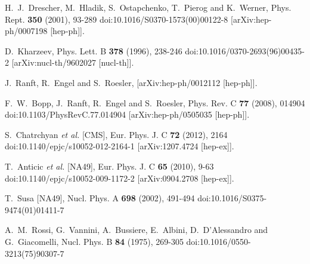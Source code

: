 \begin{thebibliography}{99}
H.~J.~Drescher, M.~Hladik, S.~Ostapchenko, T.~Pierog and K.~Werner,
Phys. Rept. \textbf{350} (2001), 93-289
doi:10.1016/S0370-1573(00)00122-8
[arXiv:hep-ph/0007198 [hep-ph]].

D.~Kharzeev,
Phys. Lett. B \textbf{378} (1996), 238-246
doi:10.1016/0370-2693(96)00435-2
[arXiv:nucl-th/9602027 [nucl-th]].

J.~Ranft, R.~Engel and S.~Roesler,
[arXiv:hep-ph/0012112 [hep-ph]].

F.~W.~Bopp, J.~Ranft, R.~Engel and S.~Roesler,
Phys. Rev. C \textbf{77} (2008), 014904
doi:10.1103/PhysRevC.77.014904
[arXiv:hep-ph/0505035 [hep-ph]].

S.~Chatrchyan \textit{et al.} [CMS],
Eur. Phys. J. C \textbf{72} (2012), 2164
doi:10.1140/epjc/s10052-012-2164-1
[arXiv:1207.4724 [hep-ex]].

T.~Anticic \textit{et al.} [NA49],
Eur. Phys. J. C \textbf{65} (2010), 9-63
doi:10.1140/epjc/s10052-009-1172-2
[arXiv:0904.2708 [hep-ex]].

T.~Susa [NA49],
Nucl. Phys. A \textbf{698} (2002), 491-494
doi:10.1016/S0375-9474(01)01411-7

A.~M.~Rossi, G.~Vannini, A.~Bussiere, E.~Albini, D.~D'Alessandro and G.~Giacomelli,
Nucl. Phys. B \textbf{84} (1975), 269-305
doi:10.1016/0550-3213(75)90307-7


\end{thebibliography}
